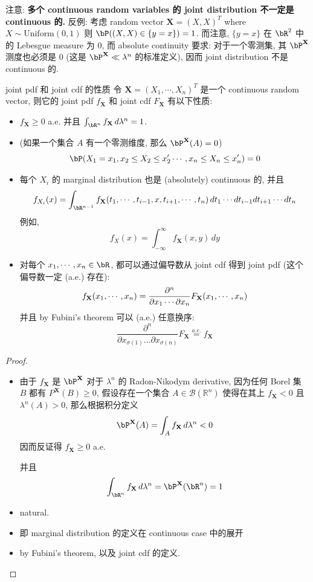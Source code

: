 \begin{remark}
    注意: \textbf{多个 continuous random variables 的 joint distribution 
    不一定是 continuous 的.}
    反例: 考虑 random vector \(\mathbf{X} = (X, X)^T\) where \(X \sim \text{Uniform}(0,1)\)
    则 $\bP((X,X) \in \{y=x\}) = 1$. 而注意, \(\{y=x\}\) 在 \(\bR^2\) 中的 Lebesgue measure 为 0, 
    而 absolute continuity 要求: 对于一个零测集, 其 \(\bP^{\mathbf{X}}\) 测度也必须是 0 (这是 \(\bP^{\mathbf{X}} \ll \lambda^n\) 的标准定义), 
    因而 joint distribution 不是 continuous 的.
\end{remark}

\begin{proposition}{joint pdf 和 joint cdf 的性质}
令 \(\mathbf{X} = (X_1, \cdots, X_n)^T\) 是一个 continuous random vector, 
则它的 joint pdf \(f_{\mathbf{X}}\) 和 joint cdf \(F_{\mathbf{X}}\) 有以下性质: 
    \begin{itemize}
        \item \(f_{\mathbf{X}}\geq 0\) a.e. 并且 \(\int_{\bR^n} f_{\mathbf{X}} \, d\lambda^n = 1\).
\item (如果一个集合 \(A\) 有一个零测维度, 那么 \(\bP^{\mathbf{X}}(A) = 0\))
\[\bP(X_1 = x_1
, x_2 \leq X_2 \leq x'_2  \cdots,  x_n \leq  X_n \leq x'_n) = 0\]

\item 每个 \(X_i\) 的 marginal distribution 也是 (absolutely) continuous 的,
并且 \[
f_{X_i}(x) = \int_{\bR^{n-1}} f_{\mathbf{X}}(t_1, \cdots, t_{i-1}, x, t_{i+1}, \cdots, t_n) \, dt_1 \cdots dt_{i-1} dt_{i+1} \cdots dt_n
\]
例如, \[
f_{X}(x) = \int_{-\infty}^\infty f_{\mathbf{X}}(x,y) \, dy
\]
\item 对每个 \(x_1, \cdots, x_n \in \bR\), 都可以通过偏导数从 joint cdf 得到 
joint pdf (这个偏导数一定 (a.e.) 存在):
\[
f_{\bf{X}}(x_1,\cdots,x_n) = \frac{\partial^n}{\partial x_1 \cdots \partial x_n} F_{\mathbf{X}}(x_1, \cdots, x_n)
\]
并且 by Fubini's theorem 可以 (a.e.) 任意换序:
$$\frac{\partial^n}{\partial x_{\sigma(1)} \dots \partial x_{\sigma(n)}} F_{\mathbf{X}} \stackrel{a.e.}{=} f_{\mathbf{X}}$$
\end{itemize}
\end{proposition}
\begin{proof}

\begin{itemize}
    \item 由于 \(f_{\mathbf{X}}\) 是 \(\bP^{\mathbf{X}}\) 对于 \(\lambda^n\) 的 Radon-Nikodym derivative, 
    因为任何 Borel 集 $B$ 都有 $P^{\mathbf{X}}(B) \ge 0$,
     假设存在一个集合 $A \in \mathcal{B}(\mathbb{R}^n)$ 
     使得在其上 $f_{\mathbf{X}} < 0$ 且 $\lambda^n(A) > 0$, 
    那么根据积分定义$$\bP^{\mathbf{X}}(A) = \int_A f_{\mathbf{X}} \, d\lambda^n < 0$$
    因而反证得 \(f_{\mathbf{X}} \geq 0\) a.e. 

    并且 \[\int_{\bR^n} f_{\mathbf{X}} \, d\lambda^n = \bP^{\mathbf{X}}(\bR^n) = 1\]

\item natural.
\item 即 marginal distribution 的定义在 continuous case 中的展开
\item by Fubini's theorem, 以及 joint cdf 的定义.
\end{itemize}
    \end{proof}

